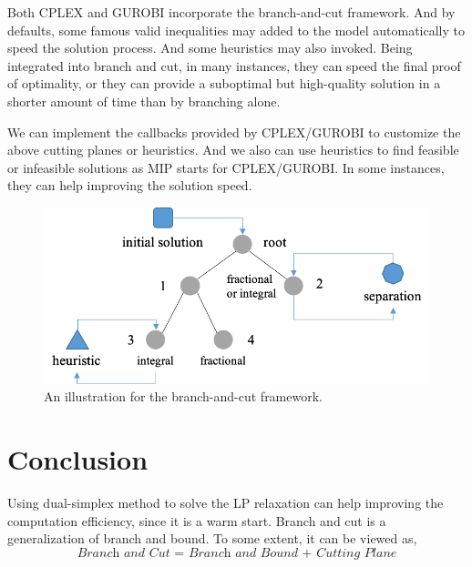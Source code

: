 \documentclass{article}
\begin{document}
Both CPLEX and GUROBI incorporate the branch-and-cut framework. And by defaults, some famous valid inequalities may added to the model automatically to speed the solution process. And some heuristics may also invoked. Being integrated into branch and cut, in many instances, they can speed the final proof of optimality, or they can provide a suboptimal but high-quality solution in a shorter amount of time than by branching alone. 

We can implement the callbacks provided by CPLEX/GUROBI to customize the above cutting planes or heuristics. And we also can use heuristics to find feasible or infeasible solutions as MIP starts for CPLEX/GUROBI. In some instances, they can help improving the solution speed.

\begin{figure}[htbp]
	\centering
	\includegraphics[width=0.7\linewidth]{figure/rn-b-a-c-framework}
	\caption{An illustration for the branch-and-cut framework.}
	\label{fig:rn-b-a-c-framework}
\end{figure}


\section{Conclusion}

Using dual-simplex method to solve the LP relaxation can help improving the computation efficiency, since it is a warm start. Branch and cut is a generalization of branch and bound. To some extent, it can be viewed as,
\begin{equation*}
\textit{Branch and Cut = Branch and Bound + Cutting Plane}
\end{equation*}

 \newpage
 
 
\end{document}
